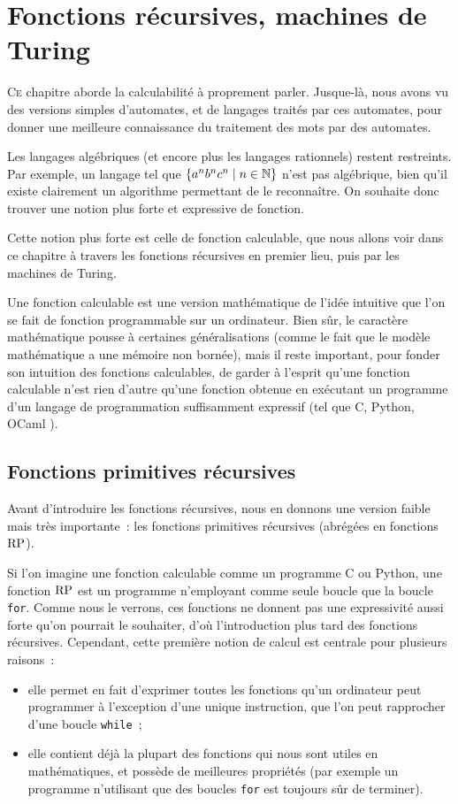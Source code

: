 \chapter{Fonctions récursives, machines de Turing}
\label{chp.recur}

\minitoc

\lettrine{C}{e} chapitre aborde la calculabilité à proprement parler. Jusque-là,
nous avons vu des versions simples d'automates, et de langages traités par ces
automates, pour donner une meilleure connaissance du traitement des mots par des
automates.

Les langages algébriques (et encore plus les langages rationnels) restent
restreints. Par exemple, un langage tel que $\left\{ a^nb^nc^n \;\middle\vert\; n \in \mathbb N \right\}$ n'est
pas algébrique, bien qu'il existe clairement un algorithme permettant de le
reconnaître. On souhaite donc trouver une notion plus forte et expressive de
fonction.

Cette notion plus forte est celle de fonction calculable, que nous allons voir
dans ce chapitre à travers les fonctions récursives en premier lieu, puis par
les machines de Turing.

Une fonction calculable est une version mathématique de l'idée intuitive que
l'on se fait de \og fonction programmable sur un ordinateur\fg. Bien sûr, le
caractère mathématique pousse à certaines généralisations (comme le fait que le
modèle mathématique a une mémoire non bornée), mais il reste important, pour
fonder son intuition des fonctions calculables, de garder à l'esprit qu'une
fonction calculable n'est rien d'autre qu'une fonction obtenue en exécutant un
programme d'un langage de programmation suffisamment expressif (tel que
C, Python, OCaml ).

\section{Fonctions primitives récursives}

Avant d'introduire les fonctions récursives, nous en donnons une version faible
mais très importante~: les fonctions primitives récursives (abrégées en
fonctions $\operatorname{RP}$).

Si l'on imagine une fonction calculable comme un programme C ou Python, une
fonction $\operatorname{RP}$ est un programme n'employant comme seule boucle que la boucle
\texttt{for}. Comme nous le verrons, ces fonctions ne donnent pas une
expressivité aussi forte qu'on pourrait le souhaiter, d'où l'introduction plus
tard des fonctions récursives. Cependant, cette première notion de calcul est
centrale pour plusieurs raisons~:
\begin{itemize}
\item elle permet en fait d'exprimer toutes les fonctions qu'un ordinateur peut
  programmer à l'exception d'une unique instruction, que l'on peut rapprocher
  d'une boucle \texttt{while}~;
\item elle contient déjà la plupart des fonctions qui nous sont utiles en
  mathématiques, et possède de meilleures propriétés (par exemple un programme
  n'utilisant que des boucles \texttt{for} est toujours sûr de terminer).
\end{itemize}

